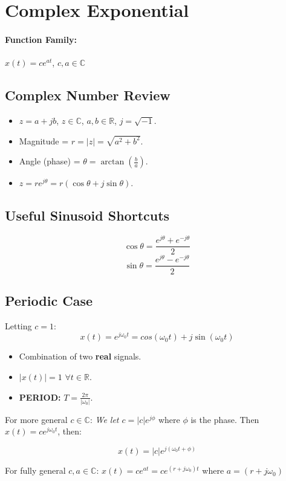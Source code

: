 \documentclass[a4paper,12pt]{report}
\def\reals{\mathbb{R}}
\begin{document}
\section{Complex Exponential}
\paragraph{Function Family: } $x(t) = c e^{at}$, $c, a\in \mathbb{C}$

\subsection{Complex Number Review}
\begin{itemize}
\item $z = a+jb$, $z\in\mathbb{C}$, $a, b \in \mathbb{R}$, $j = \sqrt{-1}$.
\item Magnitude = $r=|z| = \sqrt{a^2 + b^2}$.
\item Angle (phase) = $\theta = \arctan(\frac{b}{a})$.
\item $z = re^{j\theta} = r(\cos\theta + j\sin\theta)$.
\end{itemize}

\subsection{Useful Sinusoid Shortcuts}
$$\cos\theta = \frac{e^{j\theta} + e^{-j\theta}}{2}$$
$$\sin\theta = \frac{e^{j\theta} - e^{-j\theta}}{2}$$

\subsection{Periodic Case}
Letting $c = 1$:
$$x(t) = e^{j\omega_0 t} = cos(\omega_0 t) + j\sin(\omega_0 t)$$
\begin{itemize}
\item Combination of two \textbf{real} signals.
\item $|x(t)| = 1$ $\forall t\in\reals$.
\item \textbf{PERIOD: } $T=\frac{2\pi}{|\omega_0|}$.
\end{itemize}


For more general $c\in\mathbb{C}$: \textit{We let $c = |c|e^{j\phi}$} where $\phi$ is the phase. Then $x(t) = ce^{j\omega_0 t}$, then: 

$$x(t) = |c|e^{j(\omega_0 t + \phi)}$$

For fully general $c, a \in \mathbb{C}$: $x(t) = ce^{at} = ce^{(r+j\omega_0)t}$ where $a = (r+j\omega_0)$
\end{document}
